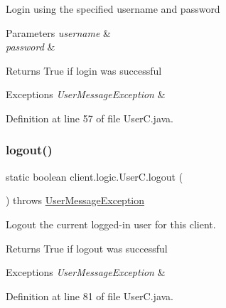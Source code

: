 Login using the specified username and password


\begin{DoxyParams}{Parameters}
{\em username} & \\
\hline
{\em password} & \\
\hline
\end{DoxyParams}
\begin{DoxyReturn}{Returns}
True if login was successful 
\end{DoxyReturn}

\begin{DoxyExceptions}{Exceptions}
{\em User\+Message\+Exception} & \\
\hline
\end{DoxyExceptions}


Definition at line 57 of file User\+C.\+java.

\hypertarget{classclient_1_1logic_1_1_user_c_a6609a9ab9414bda2dd3a6685cdec3771}{}\label{classclient_1_1logic_1_1_user_c_a6609a9ab9414bda2dd3a6685cdec3771} 
\subsubsection{\texorpdfstring{logout()}{logout()}}
{\footnotesize\ttfamily static boolean client.\+logic.\+User\+C.\+logout (\begin{DoxyParamCaption}{ }\end{DoxyParamCaption}) throws \hyperlink{classsharedlib_1_1exceptions_1_1_user_message_exception}{User\+Message\+Exception}\hspace{0.3cm}{\ttfamily [static]}}

Logout the current logged-\/in user for this client.

\begin{DoxyReturn}{Returns}
True if logout was successful 
\end{DoxyReturn}

\begin{DoxyExceptions}{Exceptions}
{\em User\+Message\+Exception} & \\
\hline
\end{DoxyExceptions}


Definition at line 81 of file User\+C.\+java.

\hypertarget{classclient_1_1logic_1_1_user_c_a81ee75a5f1f4a278a71054a9c4f72609}{}\label{classclient_1_1logic_1_1_user_c_a81ee75a5f1f4a278a71054a9c4f72609} 
